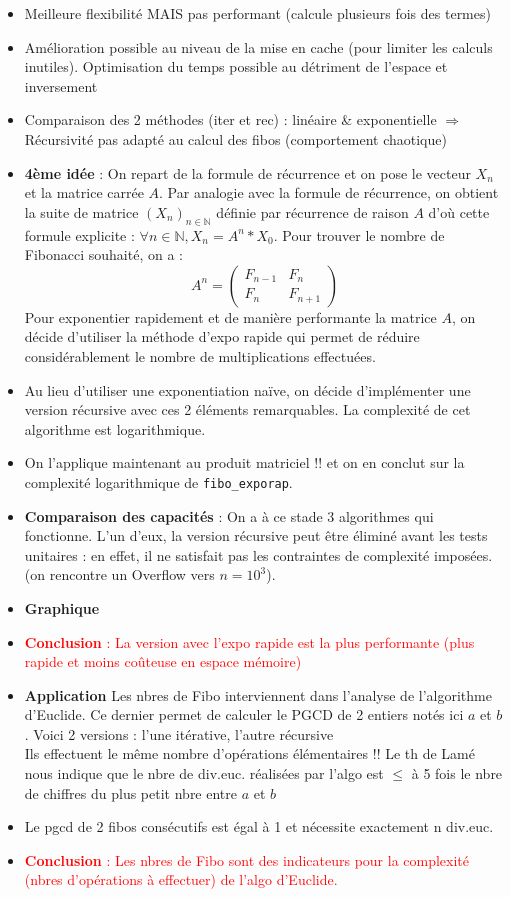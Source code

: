 \documentclass[11pt,a4paper]{article}
\begin{document}
\begin{itemize}
\item Meilleure flexibilité MAIS pas performant (calcule plusieurs fois des termes)
\item Amélioration possible au niveau de la mise en cache (pour limiter les calculs inutiles). Optimisation du temps possible au détriment de l'espace et inversement
\item Comparaison des 2 méthodes (iter et rec) : linéaire \& exponentielle
$\Rightarrow$ Récursivité pas adapté au calcul des fibos (comportement chaotique)
\item \textbf{4ème idée} : On repart de la formule de récurrence et on pose le vecteur $X_n$ et la matrice carrée $A$.
Par analogie avec la formule de récurrence, on obtient la suite de matrice $(X_n)_{n\in\mathbb{N}}$ définie par récurrence de raison $A$ d'où cette formule explicite : $\forall n \in \mathbb{N}, X_n = A^n*X_0$.
Pour trouver le nombre de Fibonacci souhaité, on a : \[A^n = 
\begin{pmatrix}
   F_{n-1} & F_n \\
   F_n & F_{n+1}
\end{pmatrix}\]
Pour exponentier rapidement et de manière performante la matrice $A$, on décide d'utiliser la méthode d'expo rapide qui permet de réduire considérablement le nombre de multiplications effectuées.
\item Au lieu d'utiliser une exponentiation naïve, on décide d'implémenter une version récursive avec ces 2 éléments remarquables. La complexité de cet algorithme est logarithmique.
\item On l'applique maintenant au produit matriciel !! et on en conclut sur la complexité logarithmique de \verb+fibo_exporap+.
\item \textbf{Comparaison des capacités} : On a à ce stade 3 algorithmes qui fonctionne. L'un d'eux, la version récursive peut être éliminé avant les tests unitaires : en effet, il ne satisfait pas les contraintes de complexité imposées. (on rencontre un Overflow vers $n = 10^3$).
\item \textbf{Graphique}
\item \textcolor{red}{\textbf{Conclusion} : La version avec l'expo rapide est la plus performante (plus rapide et moins coûteuse en espace mémoire)}
\item \textbf{Application} Les nbres de Fibo interviennent dans l'analyse de l'algorithme d'Euclide. Ce dernier permet de calculer le PGCD de 2 entiers notés ici $a$ et $b$. Voici 2 versions : l'une itérative, l'autre récursive \\
Ils effectuent le même nombre d'opérations élémentaires !! Le th de Lamé nous indique que le nbre de div.euc. réalisées par l'algo est $\leq$ à 5 fois le nbre de chiffres du plus petit nbre entre $a$ et $b$
\item Le pgcd de 2 fibos consécutifs est égal à 1 et nécessite exactement n div.euc.
\item \textcolor{red}{\textbf{Conclusion} : Les nbres de Fibo sont des indicateurs pour la complexité (nbres d'opérations à effectuer) de l'algo d'Euclide.}
\end{itemize}
\end{document}
